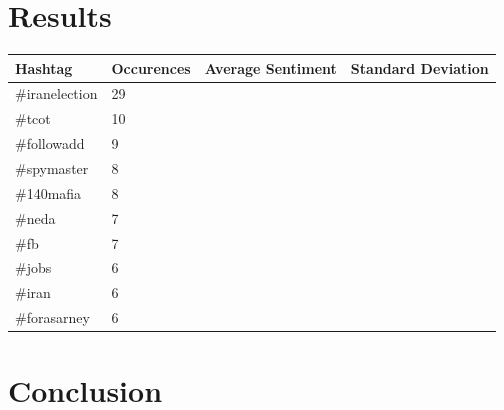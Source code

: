 \documentclass[a4paper,12px]{article}
\begin{document}
\section{Results}

\noindent\begin{tabularx}{\textwidth}{p{} p{} p{} p{}}
    Hashtag & Occurences & Average Sentiment & Standard Deviation \\
    \hline
    \#iranelection  & 29 &  &  \\
    \#tcot          & 10 &  &  \\
    \#followadd     & 9  &  &  \\
    \#spymaster     & 8  &  &  \\
    \#140mafia      & 8  &  &  \\
    \#neda          & 7  &  &  \\
    \#fb            & 7  &  &  \\
    \#jobs          & 6  &  &  \\
    \#iran          & 6  &  &  \\
    \#forasarney    & 6  &  &  \\
\end{tabularx}

\section{Conclusion}



%
%
\end{document}

